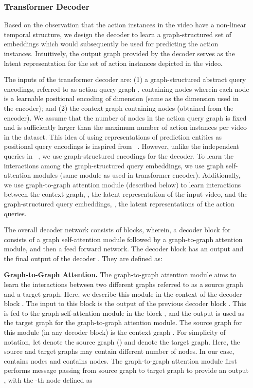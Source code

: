 \documentclass[10pt,twocolumn,letterpaper]{article}
\begin{document}
\subsubsection{Transformer Decoder}\label{subsec:decoder}
Based on the observation that the action instances in the video have a non-linear temporal structure, we design the decoder to learn a graph-structured set of embeddings which would subsequently be used for predicting the action instances.
Intuitively, the output graph provided by the decoder
serves as the latent representation for the set of action instances depicted in the video. 

The inputs of the transformer decoder are: (1) a graph-structured abstract query encodings, referred to as action query graph , containing  nodes wherein each node is a learnable positional encoding of dimension  (same as the dimension used in the encoder); and (2) the context graph  containing  nodes (obtained from the encoder). 
We assume that the number of nodes in the action query graph  is fixed and is sufficiently larger than the maximum number of action instances per video in the dataset. This idea of using representations of prediction entities as positional query encodings is inspired from ~\cite{carion2020end}. However, unlike the independent queries in ~\cite{carion2020end}, we use graph-structured encodings for the decoder.
To learn the interactions among the graph-structured query embeddings, we use graph self-attention modules (same module as used in transformer encoder). Additionally, we use graph-to-graph attention module (described below) to learn interactions between the context graph, \ie, the latent representation of the input video, and the graph-structured query embeddings, \ie, the latent representations of the action queries.




The overall decoder network  consists of  blocks, wherein, a decoder block  for  consists of a graph self-attention module followed by a graph-to-graph attention module, and then a feed forward network. The decoder block  has an output  and the final output of the decoder . They are defined as:


\vspace{0.05in}
\noindent
\textbf{Graph-to-Graph Attention.} The graph-to-graph attention module aims to learn the interactions between two different graphs referred to as a source graph and a target graph. 
Here, we describe this module in the context of the decoder block .  
The input to this block is the output  of the previous decoder block .
This is fed to the graph self-attention module in the  block , and the output is used as the target graph for the graph-to-graph attention module. 
The source graph for this module (in any decoder block) is the context graph .
For simplicity of notation, 
let  denote the source graph (\ie ) and  denote the target graph. 
Here, the source and target graphs may contain different number of nodes. In our case,  contains  nodes and  contains  nodes.
The graph-to-graph attention module first performs message passing from source graph to target graph
to provide an output , with the -th node defined as
\end{document}
